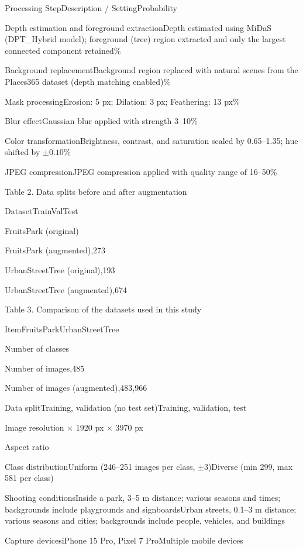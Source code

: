 Processing Step\quad Description / Setting\quad Probability

Depth estimation and foreground extraction\quad Depth estimated using MiDaS (DPT\_Hybrid model); foreground (tree) region extracted and only the largest connected component retained\%

Background replacement\quad Background region replaced with natural scenes from the Places365 dataset (depth matching enabled)\%

Mask processing\quad Erosion: 5 px; Dilation: 3 px; Feathering: 13 px\%

Blur effect\quad Gaussian blur applied with strength 3–10\%

Color transformation\quad Brightness, contrast, and saturation scaled by 0.65–1.35; hue shifted by $\pm 0.10$\%

JPEG compression\quad JPEG compression applied with quality range of 16–50\%

Table 2. Data splits before and after augmentation

Dataset\quad Train\quad Val\quad Test

FruitsPark (original)

FruitsPark (augmented),273

UrbanStreetTree (original),193

UrbanStreetTree (augmented),674

Table 3. Comparison of the datasets used in this study

Item\quad FruitsPark\quad UrbanStreetTree

Number of classes

Number of images,485

Number of images (augmented),483,966

Data split\quad Training, validation (no test set)\quad Training, validation, test

Image resolution $\times$ 1920 px $\times$ 3970 px

Aspect ratio

Class distribution\quad Uniform (246–251 images per class, $\pm 3$)\quad Diverse (min 299, max 581 per class)

Shooting conditions\quad Inside a park, 3–5 m distance; various seasons and times; backgrounds include playgrounds and signboards\quad Urban streets, 0.1–3 m distance; various seasons and cities; backgrounds include people, vehicles, and buildings

Capture devices\quad iPhone 15 Pro, Pixel 7 Pro\quad Multiple mobile devices

